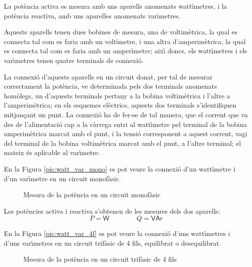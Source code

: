 La pot\`{e}ncia activa es mesura amb uns aparells anomenats watt\'{\i}metres,
i la pot\`{e}ncia reactiva, amb uns aparelles anomenats var\'{\i}metres.

Aquests aparells tenen dues bobines de mesura, una de voltim\`{e}trica,
la qual es connecta tal com es faria amb un volt\'{\i}metre, i una altra
d'amperim\`{e}trica, la qual es connecta tal com es faria amb un
amper\'{\i}metre; aix\'{\i} doncs, els watt\'{\i}metres i els var\'{\i}metres tenen
quatre terminals de connexi\'{o}.

La connexi\'{o} d'aquests aparells en un circuit donat, per tal de
mesurar correctament la pot\`{e}ncia, ve determinada pels dos terminals
anomenats hom\`{o}legs, un d'aquests terminals pertany a la bobina
voltim\`{e}trica i l'altre a l'amperim\`{e}trica; en els esquemes el\`{e}ctrics,
aquests dos terminals s'identifiquen mitjan\c{c}ant un punt. La connexi\'{o}
ha de fer-se de tal manera, que el corrent que va des de
l'alimentaci\'{o} cap a la c\`{a}rrega entri al watt\'{\i}metre pel terminal de
la bobina amperim\`{e}trica marcat amb el punt, i la tensi\'{o} corresponent
a aquest corrent, vagi del terminal de la bobina voltim\`{e}trica marcat
amb el punt, a l'altre terminal; el mateix \'{e}s aplicable al
var\'{\i}metre.

En la Figura \vref{pic:watt_var_mono} es pot veure la connexi\'{o} d'un
watt\'{\i}metre i d'un var\'{\i}metre en un circuit monof\`{a}sic.

\break

\begin{figure}[t]
\centering \PSforPDF{
    
} \caption{Mesura de la pot\`{e}ncia en un circuit  monof\`{a}sic}
\label{pic:watt_var_mono}
\end{figure}

Les pot\`{e}ncies activa i reactiva s'obtenen de les mesures dels dos
aparells:
\begin{equation}
    P = \textsf{W} \qquad\qquad Q = \textsf{VAr}
\end{equation}

En la Figura \vref{pic:watt_var_4f} es pot veure la connexi\'{o} d'uns
watt\'{\i}metres i d'uns var\'{\i}metres en un circuit trif\`{a}sic de 4 fils,
equilibrat o desequilibrat.
\begin{figure}[htb]
\centering \PSforPDF{
    
} \caption{Mesura de la pot\`{e}ncia en un circuit  trif\`{a}sic de 4 fils}
\label{pic:watt_var_4f}
\end{figure}

